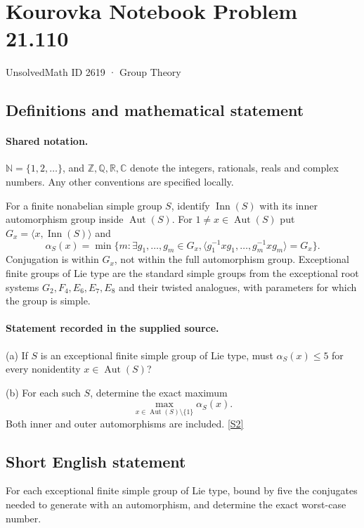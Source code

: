 \documentclass[11pt]{article}
\newcommand{\sref}[2]{\hyperlink{source:#1:#2}{[S#2]}}
\begin{document}
\setcounter{section}{2618}
\section{Kourovka Notebook Problem 21.110}\label{2619}
{\small\sffamily UnsolvedMath ID 2619 · Group Theory}
\subsection{Definitions and mathematical statement}

\paragraph{Shared notation.}$\mathbb N=\{1,2,\ldots\}$, and $\mathbb Z,\mathbb Q,\mathbb R,\mathbb C$ denote the integers, rationals, reals and complex numbers. Any other conventions are specified locally.


For a finite nonabelian simple group $S$, identify $\operatorname{Inn}(S)$ with its inner automorphism group inside $\operatorname{Aut}(S)$. For $1\ne x\in\operatorname{Aut}(S)$ put $G_x=\langle x,\operatorname{Inn}(S)\rangle$ and
\[
 \alpha_S(x)=\min\{m:\exists g_1,\ldots,g_m\in G_x,
 \langle g_1^{-1}xg_1,\ldots,g_m^{-1}xg_m\rangle=G_x\}.
\]
Conjugation is within $G_x$, not within the full automorphism group. Exceptional finite groups of Lie type are the standard simple groups from the exceptional root systems $G_2,F_4,E_6,E_7,E_8$ and their twisted analogues, with parameters for which the group is simple.
\paragraph{Statement recorded in the supplied source.}
(a) If $S$ is an exceptional finite simple group of Lie type, must $\alpha_S(x)\leq5$ for every nonidentity $x\in\operatorname{Aut}(S)$?

(b) For each such $S$, determine the exact maximum
\[
 \max_{x\in\operatorname{Aut}(S)\setminus\{1\}}\alpha_S(x).
\]
Both inner and outer automorphisms are included. \sref{2619}{2}
\subsection{Short English statement}
For each exceptional finite simple group of Lie type, bound by five the conjugates needed to generate with an automorphism, and determine the exact worst-case number.
\end{document}
